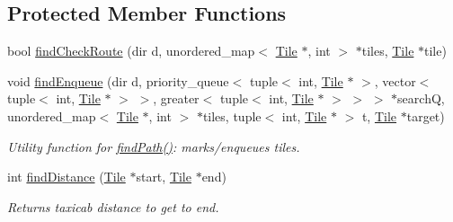 \subsection*{Protected Member Functions}
\begin{DoxyCompactItemize}
\item 
bool \hyperlink{class_terr_a820922b38b4c78c6eb0acb6a9a5d986f}{find\+Check\+Route} (dir d, unordered\+\_\+map$<$ \hyperlink{class_tile}{Tile} $\ast$, int $>$ $\ast$tiles, \hyperlink{class_tile}{Tile} $\ast$tile)
\item 
void \hyperlink{class_terr_a5821492c7a16f90399a64d74c26e2599}{find\+Enqueue} (dir d, priority\+\_\+queue$<$ tuple$<$ int, \hyperlink{class_tile}{Tile} $\ast$ $>$, vector$<$ tuple$<$ int, \hyperlink{class_tile}{Tile} $\ast$ $>$ $>$, greater$<$ tuple$<$ int, \hyperlink{class_tile}{Tile} $\ast$ $>$ $>$ $>$ $\ast$searchQ, unordered\+\_\+map$<$ \hyperlink{class_tile}{Tile} $\ast$, int $>$ $\ast$tiles, tuple$<$ int, \hyperlink{class_tile}{Tile} $\ast$ $>$ t, \hyperlink{class_tile}{Tile} $\ast$target)\hypertarget{class_terr_a5821492c7a16f90399a64d74c26e2599}{}\label{class_terr_a5821492c7a16f90399a64d74c26e2599}

\begin{DoxyCompactList}\small\item\em Utility function for \hyperlink{class_terr_ac7ae6f4b2857459afc5eac1ae83391c9}{find\+Path()}\+: marks/enqueues tiles. \end{DoxyCompactList}\item 
int \hyperlink{class_terr_ad74fdf998ebc38b3f38f8e0030f81c6d}{find\+Distance} (\hyperlink{class_tile}{Tile} $\ast$start, \hyperlink{class_tile}{Tile} $\ast$end)\hypertarget{class_terr_ad74fdf998ebc38b3f38f8e0030f81c6d}{}\label{class_terr_ad74fdf998ebc38b3f38f8e0030f81c6d}

\begin{DoxyCompactList}\small\item\em Returns taxicab distance to get to end. \end{DoxyCompactList}\end{DoxyCompactItemize}
